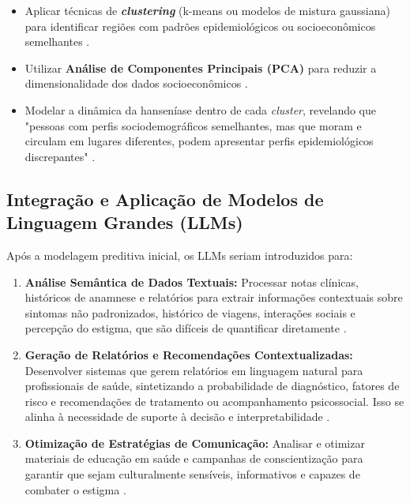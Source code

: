 \documentclass{article}
\begin{document}
\begin{enumerate}
    \begin{itemize}
        \item Aplicar técnicas de \textbf{\textit{clustering}} (k-means ou modelos de mistura gaussiana) para identificar regiões com padrões epidemiológicos ou socioeconômicos semelhantes \cite{inovacao_computacional_hanseniase}.
        \item Utilizar \textbf{Análise de Componentes Principais (PCA)} para reduzir a dimensionalidade dos dados socioeconômicos \cite{inovacao_computacional_hanseniase}.
        \item Modelar a dinâmica da hanseníase dentro de cada \textit{cluster}, revelando que "pessoas com perfis sociodemográficos semelhantes, mas que moram e circulam em lugares diferentes, podem apresentar perfis epidemiológicos discrepantes" \cite{inovacao_computacional_hanseniase, saldanha2021ciencia}.
    \end{itemize}
\end{enumerate}

\subsection{Integração e Aplicação de Modelos de Linguagem Grandes (LLMs)}
Após a modelagem preditiva inicial, os LLMs seriam introduzidos para:
\begin{enumerate}
    \item \textbf{Análise Semântica de Dados Textuais:} Processar notas clínicas, históricos de anamnese e relatórios para extrair informações contextuais sobre sintomas não padronizados, histórico de viagens, interações sociais e percepção do estigma, que são difíceis de quantificar diretamente \cite{brasil2022pcdt}.
    \item \textbf{Geração de Relatórios e Recomendações Contextualizadas:} Desenvolver sistemas que gerem relatórios em linguagem natural para profissionais de saúde, sintetizando a probabilidade de diagnóstico, fatores de risco e recomendações de tratamento ou acompanhamento psicossocial. Isso se alinha à necessidade de suporte à decisão e interpretabilidade \cite{saldanha2021ciencia, brasil2022pcdt}.
    \item \textbf{Otimização de Estratégias de Comunicação:} Analisar e otimizar materiais de educação em saúde e campanhas de conscientização para garantir que sejam culturalmente sensíveis, informativos e capazes de combater o estigma \cite{brasil2022pcdt}.
\end{enumerate}
\end{document}
